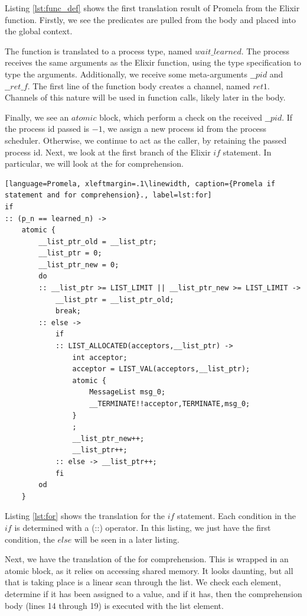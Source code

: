 Listing \ref{lst:func_def} shows the first translation result of Promela from the Elixir function. Firstly, we see the predicates are pulled from the body and placed into the global context.
\par
The function is translated to a process type, named $wait\_learned$. The process receives the same arguments as the Elixir function, using the type specification to type the arguments. Additionally, we receive some meta-arguments $\_\_pid$ and $\_\_ret\_f$. The first line of the function body creates a channel, named $ret1$. Channels of this nature will be used in function calls, likely later in the body.
\par
Finally, we see an $atomic$ block, which perform a check on the received $\_\_pid$. If the process id passed is $-1$, we assign a new process id from the process scheduler. Otherwise, we continue to act as the caller, by retaining the passed process id.
Next, we look at the first branch of the Elixir $if$ statement. In particular, we will look at the for comprehension.
\begin{lstlisting}[language=Promela, xleftmargin=.1\linewidth, caption={Promela if statement and for comprehension}., label=lst:for]
if
:: (p_n == learned_n) -> 
    atomic {
        __list_ptr_old = __list_ptr;
        __list_ptr = 0;
        __list_ptr_new = 0;
        do
        :: __list_ptr >= LIST_LIMIT || __list_ptr_new >= LIST_LIMIT -> 
            __list_ptr = __list_ptr_old;
            break;
        :: else -> 
            if
            :: LIST_ALLOCATED(acceptors,__list_ptr) -> 
                int acceptor;
                acceptor = LIST_VAL(acceptors,__list_ptr);
                atomic {
                    MessageList msg_0;
                    __TERMINATE!!acceptor,TERMINATE,msg_0; 
                }
                ;
                __list_ptr_new++;
                __list_ptr++;
            :: else -> __list_ptr++;
            fi
        od
    }
\end{lstlisting}
Listing \ref{lst:for} shows the translation for the $if$ statement. Each condition in the $if$ is determined with a (::) operator. In this listing, we just have the first condition, the $else$ will be seen in a later listing. 
\par
Next, we have the translation of the for comprehension. This is wrapped in an atomic block, as it relies on accessing shared memory. It looks daunting, but all that is taking place is a linear scan through the list. We check each element, determine if it has been assigned to a value, and if it has, then the comprehension body (lines 14 through 19) is executed with the list element.
